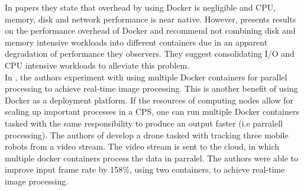 In papers \cite{p6,c2,p3,p4,p7,c1} they state that overhead by using Docker is negligible and CPU, memory, disk and network performance is near native. However, \cite{p5} presents results on the performance overhead of Docker and recommend not combining disk and memory intensive workloads into different containers due in an apparent degradation of performance they observers. They suggest consolidating I/O and CPU intensive workloads to alleviate this problem. \\

In \cite{p8}, the authors experiment with using multiple Docker containers for parallel processing to achieve real-time image processing. This is another benefit of using Docker as a deployment platform. If the resources of computing nodes allow for scaling up important processes in a CPS, one can run multiple Docker containers tasked with the same responsibility to produce an output faster (i.e parralell processing). The authors of \cite{p8} develop a drone tasked with tracking three mobile robots from a video stream. The video stream is sent to the cloud, in which multiple docker containers process the data in parralel. The authors were able to improve input frame rate by 158\%, using two containers, to achieve real-time image processing. 




